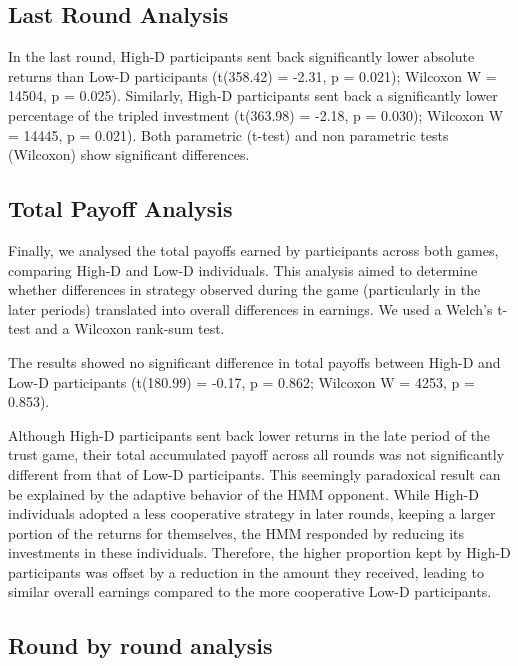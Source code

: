 \documentclass[
]{article}
\begin{document}
\subsection{Last Round Analysis}\label{last-round-analysis}

In the last round, High-D participants sent back significantly lower absolute returns than Low-D participants (t(358.42) = -2.31, p = 0.021); Wilcoxon W = 14504, p = 0.025). Similarly, High-D participants sent back a significantly lower percentage of the tripled investment (t(363.98) = -2.18, p = 0.030); Wilcoxon W = 14445, p = 0.021). Both parametric (t-test) and non parametric tests (Wilcoxon) show significant differences.

\subsection{Total Payoff Analysis}\label{total-payoff-analysis}

Finally, we analysed the total payoffs earned by participants across both games, comparing High-D and Low-D individuals. This analysis aimed to determine whether differences in strategy observed during the game (particularly in the later periods) translated into overall differences in earnings. We used a Welch's t-test and a Wilcoxon rank-sum test.

The results showed no significant difference in total payoffs between High-D and Low-D participants (t(180.99) = -0.17, p = 0.862; Wilcoxon W = 4253, p = 0.853).

Although High-D participants sent back lower returns in the late period of the trust game, their total accumulated payoff across all rounds was not significantly different from that of Low-D participants. This seemingly paradoxical result can be explained by the adaptive behavior of the HMM opponent. While High-D individuals adopted a less cooperative strategy in later rounds, keeping a larger portion of the returns for themselves, the HMM responded by reducing its investments in these individuals. Therefore, the higher proportion kept by High-D participants was offset by a reduction in the amount they received, leading to similar overall earnings compared to the more cooperative Low-D participants.

\subsection{Round by round analysis}\label{round-by-round-analysis}
\end{document}
